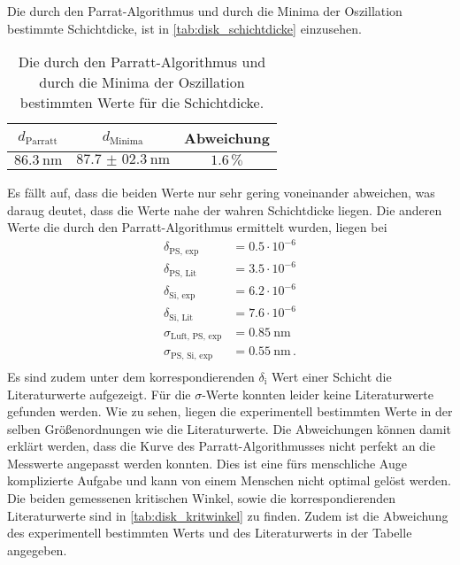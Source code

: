 Die durch den Parrat-Algorithmus und durch die Minima der Oszillation bestimmte Schichtdicke, ist in \autoref{tab:disk_schichtdicke} einzusehen.
\begin{table}
    \centering
    \caption{Die durch den Parratt-Algorithmus und durch die Minima der Oszillation bestimmten Werte für die Schichtdicke.}
    \begin{tabular}{ccc}
        \toprule
        $d_\text{Parratt}$ & $d_\text{Minima} $ & Abweichung \\
        \midrule
        $\SI{86.3}{\nano\meter}$ &$\SI{87.7(023)}{\nano\meter}$& $1.6 \, \%$ \\
        \bottomrule
    \end{tabular}
    \label{tab:disk_schichtdicke}
\end{table}
Es fällt auf, dass die beiden Werte nur sehr gering voneinander abweichen, was daraug deutet, dass die Werte nahe der wahren Schichtdicke liegen.
Die anderen Werte die durch den Parratt-Algorithmus ermittelt wurden, liegen bei
\begin{align*}
    \delta_\text{PS, exp} &= 0.5 \cdot 10^{-6}      \\
    \delta_\text{PS, Lit} &= 3.5 \cdot 10^{-6}      \\ 
    \delta_\text{Si, exp} &= 6.2 \cdot 10^{-6}      \\
    \delta_\text{Si, Lit} &= 7.6 \cdot 10^{-6}      \\
    \sigma_\text{Luft, PS, exp} &= \SI{0.85}{\nano\meter} \\ 
    \sigma_\text{PS, Si, exp} &= \SI{0.55}{\nano\meter}\, . \\ 
\end{align*}
Es sind zudem unter dem korrespondierenden $\delta_\text{i}$ Wert einer Schicht die Literaturwerte aufgezeigt.
Für die $\sigma$-Werte konnten leider keine Literaturwerte gefunden werden.
Wie zu sehen, liegen die experimentell bestimmten Werte in der selben Größenordnungen wie die Literaturwerte.
Die Abweichungen können damit erklärt werden, dass die Kurve des Parratt-Algorithmusses nicht perfekt an die Messwerte angepasst werden konnten.
Dies ist eine fürs menschliche Auge komplizierte Aufgabe und kann von einem Menschen nicht optimal gelöst werden.
Die beiden gemessenen kritischen Winkel, sowie die korrespondierenden Literaturwerte sind in \autoref{tab:disk_kritwinkel} zu finden.
Zudem ist die Abweichung des experimentell bestimmten Werts und des Literaturwerts in der Tabelle angegeben.
